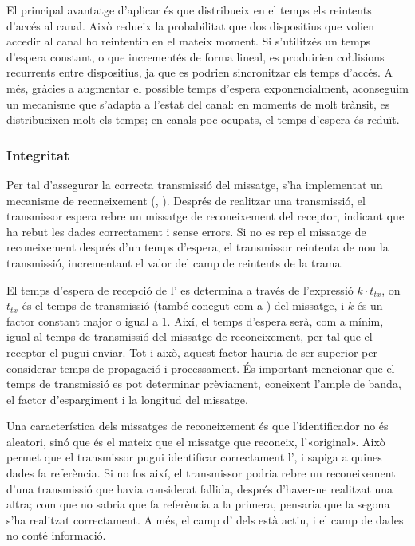\documentclass{tfgitic}[2024/07/01]
\begin{document}
El principal avantatge d'aplicar  és que distribueix en el temps els reintents d'accés al canal. Això redueix la probabilitat que dos dispositius que volien accedir al canal ho reintentin en el mateix moment. Si s'utilitzés un temps d'espera constant, o que incrementés de forma lineal, es produirien co\l.lisions recurrents entre dispositius, ja que es podrien sincronitzar els temps d'accés. A més, gràcies a augmentar el possible temps d'espera exponencialment, aconseguim un mecanisme que s'adapta a l'estat del canal: en moments de molt trànsit, es distribueixen molt els temps; en canals poc ocupats, el temps d'espera és reduït.
\subsubsection{Integritat}
\label{subsubsec:integritat}
Per tal d'assegurar la correcta transmissió del missatge, s'ha implementat un mecanisme de reconeixement (, ). Després de realitzar una transmissió, el transmissor espera rebre un missatge de reconeixement del receptor, indicant que ha rebut les dades correctament i sense errors. Si no es rep el missatge de reconeixement després d'un temps d'espera, el transmissor reintenta de nou la transmissió, incrementant el valor del camp de reintents de la trama.

El temps d'espera de recepció de l' es determina a través de l'expressió $k \cdot t_{tx}$, on $t_{tx}$ és el temps de transmissió (també conegut com a ) del missatge, i $k$ és un factor constant major o igual a 1. Així, el temps d'espera serà, com a mínim, igual al temps de transmissió del missatge de reconeixement, per tal que el receptor el pugui enviar. Tot i això, aquest factor hauria de ser superior per considerar temps de propagació i processament. És important mencionar que el temps de transmissió es pot determinar prèviament, coneixent l'ample de banda, el factor d'espargiment i la longitud del missatge.

Una característica dels missatges de reconeixement és que l'identificador no és aleatori, sinó que és el mateix que el missatge que reconeix, l'«original». Això permet que el transmissor pugui identificar correctament l', i sapiga a quines dades fa referència. Si no fos així, el transmissor podria rebre un reconeixement d'una transmissió que havia considerat fallida, després d'haver-ne realitzat una altra; com que no sabria que fa referència a la primera, pensaria que la segona s'ha realitzat correctament. A més, el camp d' dels  està actiu, i el camp de dades no conté informació.
\end{document}
